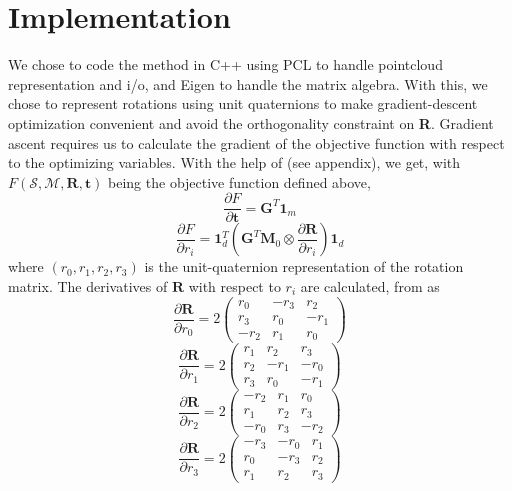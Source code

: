 \documentclass[11pt, a4paper]{article}
\begin{document}
\section{Implementation}
We chose to code the method in C++ using PCL to handle pointcloud representation and i/o, and Eigen to handle the matrix algebra. With this, we chose to represent rotations using unit quaternions to make gradient-descent optimization convenient and avoid the orthogonality constraint on \textbf{R}.
\linebreak \linebreak
\noindent Gradient ascent requires us to calculate the gradient of the objective function with respect to the optimizing variables. With the help of \cite{mainPre} (see appendix), we get, with $F(\mathcal{S}, \mathcal{M}, \textbf{R}, \textbf{t})$ being the objective function defined above, $$\frac{\partial F}{\partial \textbf{t}} = \textbf{G}^T\textbf{1}_m$$ $$\frac{\partial F}{\partial r_i} = \textbf{1}_d^T \left(\textbf{G}^T\textbf{M}_0 \otimes \frac{\partial \textbf{R}}{\partial r_i}\right)\textbf{1}_d$$ where $(r_0, r_1, r_2, r_3)$ is the unit-quaternion representation of the rotation matrix.
\linebreak \linebreak
\noindent
The derivatives of $\textbf{R}$ with respect to $r_i$ are calculated, from \cite{quatParam} as
$$\frac{\partial \textbf{R}}{\partial r_0} = 2\begin{pmatrix}
  r_0 & -r_3 & r_2 \\
  r_3 & r_0 & -r_1 \\
  -r_2 & r_1 & r_0
 \end{pmatrix}$$
$$\frac{\partial \textbf{R}}{\partial r_1} = 2\begin{pmatrix}
  r_1 & r_2 & r_3 \\
  r_2 & -r_1 & -r_0 \\
  r_3 & r_0 & -r_1
 \end{pmatrix}$$
$$\frac{\partial \textbf{R}}{\partial r_2} = 2\begin{pmatrix}
  -r_2 & r_1 & r_0 \\
  r_1 & r_2 & r_3 \\
  -r_0 & r_3 & -r_2
 \end{pmatrix}$$
$$\frac{\partial \textbf{R}}{\partial r_3} = 2\begin{pmatrix}
  -r_3 & -r_0 & r_1 \\
  r_0 & -r_3 & r_2 \\
  r_1 & r_2 & r_3
 \end{pmatrix}$$
\end{document}
